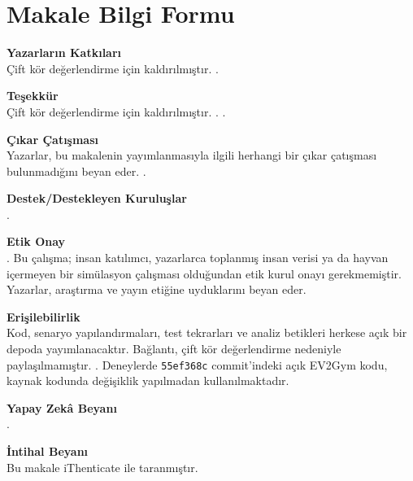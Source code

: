 \section*{Makale Bilgi Formu}

\textbf{Yazarların Katkıları}\\
\ifanonymous
Çift kör değerlendirme için kaldırılmıştır.
\else
{}.
\fi

\textbf{Teşekkür}\\
\ifanonymous
Çift kör değerlendirme için kaldırılmıştır.
\else
{}.
\fi
{}.

\textbf{Çıkar Çatışması}\\
Yazarlar, bu makalenin yayımlanmasıyla ilgili herhangi bir çıkar çatışması bulunmadığını beyan eder.
.

\textbf{Destek/Destekleyen Kuruluşlar}\\
.

\textbf{Etik Onay}\\
.
Bu çalışma; insan katılımcı, yazarlarca toplanmış insan verisi ya da hayvan içermeyen bir simülasyon çalışması olduğundan etik kurul onayı gerekmemiştir.
Yazarlar, araştırma ve yayın etiğine uyduklarını beyan eder.

\textbf{Erişilebilirlik}\\
Kod, senaryo yapılandırmaları, test tekrarları ve analiz betikleri herkese açık bir depoda yayımlanacaktır.
\ifanonymous
Bağlantı, çift kör değerlendirme nedeniyle paylaşılmamıştır.
\else
{}.
\fi
Deneylerde \texttt{55ef368c} commit'indeki açık EV2Gym kodu, kaynak kodunda değişiklik yapılmadan kullanılmaktadır.

\textbf{Yapay Zekâ Beyanı}\\
.

\textbf{İntihal Beyanı}\\
Bu makale iThenticate\texttrademark{} ile taranmıştır.
